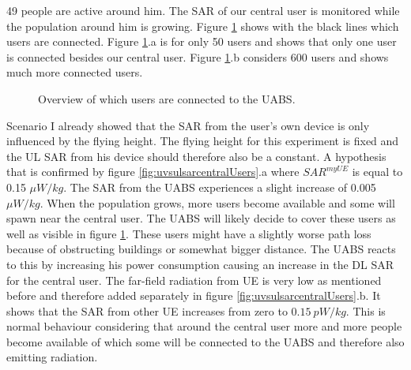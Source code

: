 49 people are active around him. The \gls{SAR} of our central user is monitored while the population around him is growing.
Figure \ref{fig:connectionMap} shows with the black lines which users are connected. Figure \ref{fig:connectionMap}.a is for only 50 users and 
shows that only one user is connected besides our central user. Figure \ref{fig:connectionMap}.b considers 600 users and shows much more connected users.
\begin{figure}[h]
\hfill
{}
\caption{Overview of which users are connected to the \acs{UABS}.}
  \label{fig:connectionMap}
\end{figure}

Scenario I already showed that the \gls{SAR} from the user's own device is only influenced by the flying height. 
The flying height for this experiment is fixed and the \gls{UL} \gls{SAR} from his device should therefore also be a constant. 
A hypothesis that is confirmed by figure \ref{fig:uvsulsarcentralUsers}.a where $SAR^{myUE}$ is equal to 0.15 $\mu W/kg$.
The \gls{SAR} from the \gls{UABS} experiences a slight increase of 0.005 $\mu W/kg$. When the population grows, more users become available 
and some will spawn near the central user. The \gls{UABS} will likely decide to cover these users as well as visible in figure \ref{fig:connectionMap}.
These users might have a slightly 
worse path loss because of obstructing buildings or somewhat bigger distance. The \gls{UABS} reacts to this by increasing 
his power consumption causing an increase in the \gls{DL} \gls{SAR} for the central user.
The far-field radiation from \gls{UE} is very low as mentioned before and therefore added separately in figure \ref{fig:uvsulsarcentralUsers}.b.
It shows that the \gls{SAR}  from other \gls{UE} increases from zero to $0.15\ pW/kg$. This is normal 
behaviour considering that around the central user more and more people become available of which some will be connected to the \gls{UABS}
and therefore also emitting radiation.

